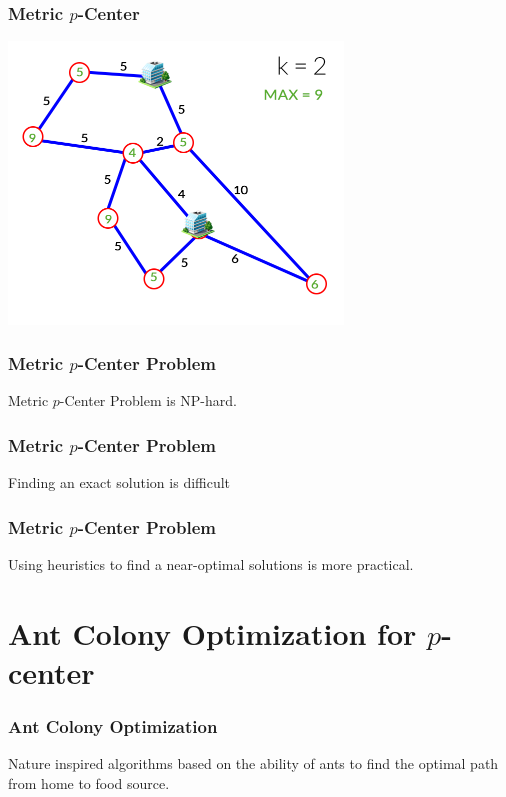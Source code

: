 \documentclass[12pt]{beamer}
\begin{document}
\begin{frame}
\frametitle{Metric $p$-Center}
\begin{center}
\includegraphics[height=75mm]{Images/metric7}\\
\end{center}
\end{frame}

\begin{frame}
\frametitle{Metric $p$-Center Problem}
\begin{center}
Metric $p$-Center Problem is \alert{NP-hard}.  
\end{center}
\end{frame}

\begin{frame}
\frametitle{Metric $p$-Center Problem}
\begin{center}
Finding an exact solution is \alert{difficult}  
\end{center}
\end{frame}

\begin{frame}
\frametitle{Metric $p$-Center Problem}
\begin{center}
Using heuristics to find a \alert{near-optimal} solutions is more practical.  
\end{center}
\end{frame}

\section{Ant Colony Optimization for $p$-center}
\begin{frame}
\frametitle{Ant Colony Optimization}
\begin{center}
Nature inspired algorithms based on the ability of \alert{ants} to find the \alert{optimal path} from home to food source.
\end{center}
\end{frame}
\end{document}

